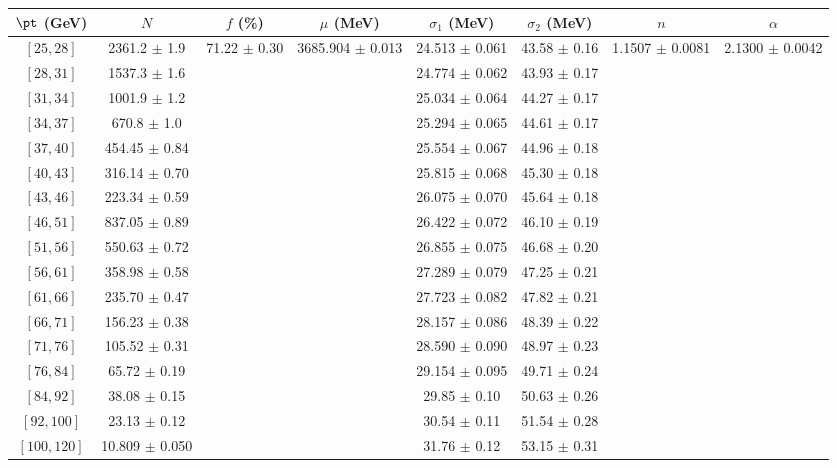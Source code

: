\begin{tabular}{c||c|c|c|c|c|c|c}
$\pt$ (GeV) & $N$ & $f$ (\%) & $\mu$ (MeV) & $\sigma_1$ (MeV) & $\sigma_2$ (MeV) & $n$ & $\alpha$ \\
\hline
$[25, 28]$ & 2361.2 $\pm$ 1.9 & \multirow{17}{*}{71.22 $\pm$ 0.30} & \multirow{17}{*}{3685.904 $\pm$ 0.013} & 24.513 $\pm$ 0.061 & 43.58 $\pm$ 0.16 & \multirow{17}{*}{1.1507 $\pm$ 0.0081} & \multirow{17}{*}{2.1300 $\pm$ 0.0042}\\
$[28, 31]$ & 1537.3 $\pm$ 1.6 &  &  & 24.774 $\pm$ 0.062 & 43.93 $\pm$ 0.17 &  & \\
$[31, 34]$ & 1001.9 $\pm$ 1.2 &  &  & 25.034 $\pm$ 0.064 & 44.27 $\pm$ 0.17 &  & \\
$[34, 37]$ & 670.8 $\pm$ 1.0 &  &  & 25.294 $\pm$ 0.065 & 44.61 $\pm$ 0.17 &  & \\
$[37, 40]$ & 454.45 $\pm$ 0.84 &  &  & 25.554 $\pm$ 0.067 & 44.96 $\pm$ 0.18 &  & \\
$[40, 43]$ & 316.14 $\pm$ 0.70 &  &  & 25.815 $\pm$ 0.068 & 45.30 $\pm$ 0.18 &  & \\
$[43, 46]$ & 223.34 $\pm$ 0.59 &  &  & 26.075 $\pm$ 0.070 & 45.64 $\pm$ 0.18 &  & \\
$[46, 51]$ & 837.05 $\pm$ 0.89 &  &  & 26.422 $\pm$ 0.072 & 46.10 $\pm$ 0.19 &  & \\
$[51, 56]$ & 550.63 $\pm$ 0.72 &  &  & 26.855 $\pm$ 0.075 & 46.68 $\pm$ 0.20 &  & \\
$[56, 61]$ & 358.98 $\pm$ 0.58 &  &  & 27.289 $\pm$ 0.079 & 47.25 $\pm$ 0.21 &  & \\
$[61, 66]$ & 235.70 $\pm$ 0.47 &  &  & 27.723 $\pm$ 0.082 & 47.82 $\pm$ 0.21 &  & \\
$[66, 71]$ & 156.23 $\pm$ 0.38 &  &  & 28.157 $\pm$ 0.086 & 48.39 $\pm$ 0.22 &  & \\
$[71, 76]$ & 105.52 $\pm$ 0.31 &  &  & 28.590 $\pm$ 0.090 & 48.97 $\pm$ 0.23 &  & \\
$[76, 84]$ & 65.72 $\pm$ 0.19 &  &  & 29.154 $\pm$ 0.095 & 49.71 $\pm$ 0.24 &  & \\
$[84, 92]$ & 38.08 $\pm$ 0.15 &  &  & 29.85 $\pm$ 0.10 & 50.63 $\pm$ 0.26 &  & \\
$[92, 100]$ & 23.13 $\pm$ 0.12 &  &  & 30.54 $\pm$ 0.11 & 51.54 $\pm$ 0.28 &  & \\
$[100, 120]$ & 10.809 $\pm$ 0.050 &  &  & 31.76 $\pm$ 0.12 & 53.15 $\pm$ 0.31 &  & \\
\end{tabular}
